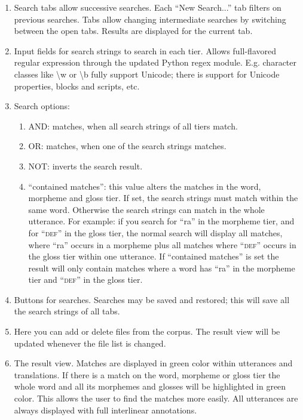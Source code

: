 \begin{enumerate}
\item Search tabs allow successive searches. Each ``New Search...'' tab filters on previous searches. Tabs allow changing intermediate searches by switching between the open tabs. Results are displayed for the current tab.
\item Input fields for search strings to search in each tier. Allows full-flavored regular expression through the updated Python regex module. E.g. character classes like {\textbackslash}w or {\textbackslash}b fully support Unicode; there is support for Unicode properties, blocks and scripts, etc.
\item Search options:

 \begin{enumerate}
 \item AND: matches, when all search strings of all tiers match.
 \item OR: matches, when one of the search strings matches.
 \item NOT: inverts the search result.
 \item ``contained matches'': this value alters the matches in the word, morpheme and gloss tier. If set, the search strings must match within the same word. Otherwise the search strings can match in the whole utterance. For example: if you search for ``ra'' in the morpheme tier, and for ``\textsc{def}'' in the gloss tier, the normal search will display all matches, where ``ra'' occurs in a morpheme plus all matches where ``\textsc{def}'' occurs in the gloss tier within one utterance. If ``contained matches'' is set the result will only contain matches where a word has ``ra'' in the morpheme tier and ``\textsc{def}'' in the gloss tier.
 \end{enumerate}

 \item Buttons for searches. Searches may be saved and restored; this will save all the search strings of all tabs.
 \item Here you can add or delete files from the corpus. The result view will be updated whenever the file list is changed.
 \item The result view. Matches are displayed in green color within utterances and translations. If there is a match on the word, morpheme or gloss tier the whole word and all its morphemes and glosses will be highlighted in green color. This allows the user to find the matches more easily. All utterances are always displayed with full interlinear annotations.
\end{enumerate}

